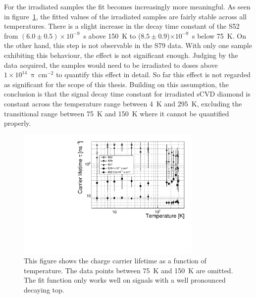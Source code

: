 For the irradiated samples the fit becomes increasingly more meaningful. As seen in figure~\ref{fig:lifetimevstemp}, the fitted values of the irradiated samples are fairly stable across all temperatures. There is a slight increase in the decay time constant of the S52 from $(6.0\pm0.5)\times10^{-9}$~s above 150~K to ($8.5\pm0.9$)$\times10^{-9}$~s below 75~K. On the other hand, this step is not observable in the S79 data. With only one sample exhibiting this behaviour, the effect is not significant enough. Judging by the data acquired, the samples would need to be irradiated to doses above $1\times10^{14}~\uppi~$cm$^{-2}$ to quantify this effect in detail. So far this effect is not regarded as significant for the scope of this thesis. Building on this assumption, the conclusion is that the signal decay time constant for irradiated sCVD diamond is constant across the temperature range between 4~K and 295~K, excluding the transitional range between 75~K and 150~K  where it cannot be quantified properly. 

\begin{figure}[!t]
\centering
\includegraphics[width=0.80\textwidth]{03_measurement_results/scripts/plots/taunew/lifetimevstemp}
\caption{This figure shows the charge carrier lifetime as a function of temperature. The data points between 75~K and 150~K are omitted. The fit function only works well on signals with a well pronounced decaying top.}
 \label{fig:lifetimevstemp}
\end{figure}

